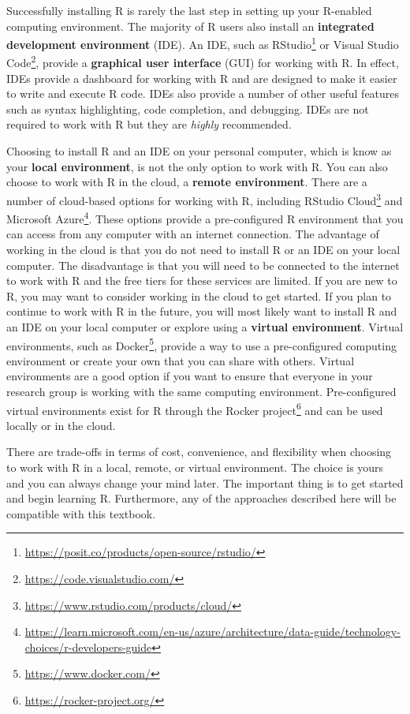 \documentclass[
  letterpaper,
]{latex/krantz}
\DeclareRobustCommand{\href}[2]{#2\footnote{\url{#1}}}
\begin{document}
Successfully installing R is rarely the last step in setting up your
R-enabled computing environment. The majority of R users also install an
\textbf{integrated development environment} (IDE). An IDE, such as
\href{https://posit.co/products/open-source/rstudio/}{RStudio} or
\href{https://code.visualstudio.com/}{Visual Studio Code}, provide a
\textbf{graphical user interface} (GUI) for working with R. In effect,
IDEs provide a dashboard for working with R and are designed to make it
easier to write and execute R code. IDEs also provide a number of other
useful features such as syntax highlighting, code completion, and
debugging. IDEs are not required to work with R but they are
\emph{highly} recommended.

Choosing to install R and an IDE on your personal computer, which is
know as your \textbf{local environment}, is not the only option to work
with R. You can also choose to work with R in the cloud, a
\textbf{remote environment}. There are a number of cloud-based options
for working with R, including
\href{https://www.rstudio.com/products/cloud/}{RStudio Cloud} and
\href{https://learn.microsoft.com/en-us/azure/architecture/data-guide/technology-choices/r-developers-guide}{Microsoft
Azure}. These options provide a pre-configured R environment that you
can access from any computer with an internet connection. The advantage
of working in the cloud is that you do not need to install R or an IDE
on your local computer. The disadvantage is that you will need to be
connected to the internet to work with R and the free tiers for these
services are limited. If you are new to R, you may want to consider
working in the cloud to get started. If you plan to continue to work
with R in the future, you will most likely want to install R and an IDE
on your local computer or explore using a \textbf{virtual environment}.
Virtual environments, such as \href{https://www.docker.com/}{Docker},
provide a way to use a pre-configured computing environment or create
your own that you can share with others. Virtual environments are a good
option if you want to ensure that everyone in your research group is
working with the same computing environment. Pre-configured virtual
environments exist for R through the
\href{https://rocker-project.org/}{Rocker project} and can be used
locally or in the cloud.

There are trade-offs in terms of cost, convenience, and flexibility when
choosing to work with R in a local, remote, or virtual environment. The
choice is yours and you can always change your mind later. The important
thing is to get started and begin learning R. Furthermore, any of the
approaches described here will be compatible with this textbook.
\end{document}
